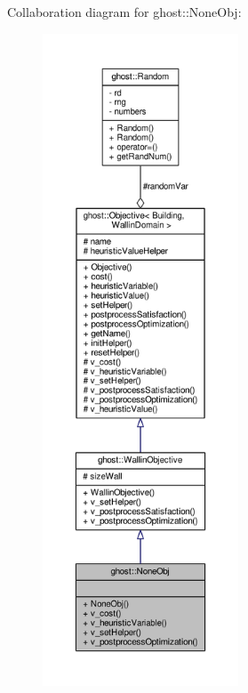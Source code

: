Collaboration diagram for ghost\-:\-:None\-Obj\-:
\nopagebreak
\begin{figure}[H]
\begin{center}
\leavevmode
\includegraphics[height=550pt]{classghost_1_1NoneObj__coll__graph}
\end{center}
\end{figure}
